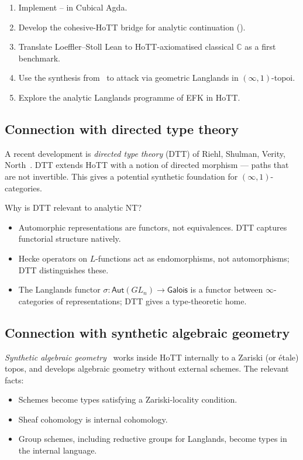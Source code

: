 \documentclass[12pt]{article}
\theoremstyle{definition}
\theoremstyle{remark}
\newcommand{\C}{\mathbb{C}}
\begin{document}
\begin{enumerate}
\item Implement -- in Cubical Agda.
\item Develop the cohesive-HoTT bridge for analytic continuation
().
\item Translate Loeffler--Stoll Lean to HoTT-axiomatised classical $\C$ as
a first benchmark.
\item Use the synthesis from~\cite{Long2026Synthesis} to attack
 via geometric Langlands in $(\infty,1)$-topoi.
\item Explore the analytic Langlands programme of EFK
\cite{EFK2025AnalyticLanglands} in HoTT.
\end{enumerate}

\subsection{Connection with directed type theory}

A recent development is \emph{directed type theory} (DTT) of Riehl,
Shulman, Verity, North~\cite{Riehl2021Elements}. DTT extends HoTT with a
notion of directed morphism — paths that are not invertible. This gives a
potential synthetic foundation for $(\infty,1)$-categories.

Why is DTT relevant to analytic NT?
\begin{itemize}
\item Automorphic representations are functors, not equivalences. DTT
captures functorial structure natively.
\item Hecke operators on $L$-functions act as endomorphisms, not
automorphisms; DTT distinguishes these.
\item The Langlands functor $\sigma:\mathsf{Aut}(GL_n) \to \mathsf{Galois}$
is a functor between $\infty$-categories of representations; DTT gives a
type-theoretic home.
\end{itemize}

\subsection{Connection with synthetic algebraic geometry}

\emph{Synthetic algebraic geometry}~\cite{CherubiniRijke2024} works inside
HoTT internally to a Zariski (or étale) topos, and develops algebraic
geometry without external schemes. The relevant facts:
\begin{itemize}
\item Schemes become types satisfying a Zariski-locality condition.
\item Sheaf cohomology is internal cohomology.
\item Group schemes, including reductive groups for Langlands, become
types in the internal language.
\end{itemize}
\end{document}
